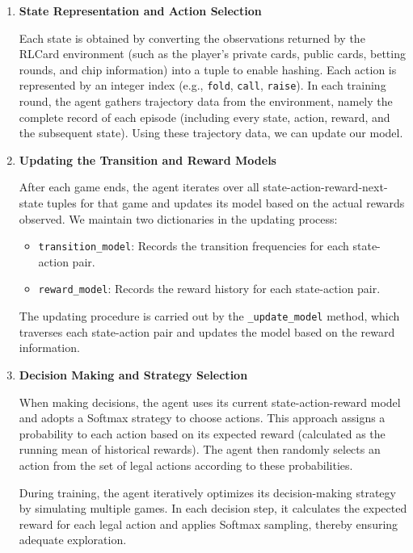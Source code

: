 \documentclass{article}
\begin{document}
\begin{enumerate}
    \item \textbf{State Representation and Action Selection}

    Each state is obtained by converting the observations returned by the RLCard environment (such as the player's private cards, public cards, betting rounds, and chip information) into a tuple to enable hashing. Each action is represented by an integer index (e.g., \texttt{fold}, \texttt{call}, \texttt{raise}). In each training round, the agent gathers trajectory data from the environment, namely the complete record of each episode (including every state, action, reward, and the subsequent state). Using these trajectory data, we can update our model.

    \item \textbf{Updating the Transition and Reward Models}

    After each game ends, the agent iterates over all state-action-reward-next-state tuples for that game and updates its model based on the actual rewards observed. We maintain two dictionaries in the updating process:
    \begin{itemize}
        \item \texttt{transition\_model}: Records the transition frequencies for each state-action pair.
        \item \texttt{reward\_model}: Records the reward history for each state-action pair.
    \end{itemize}

    The updating procedure is carried out by the \texttt{\_update\_model} method, which traverses each state-action pair and updates the model based on the reward information.

    \item \textbf{Decision Making and Strategy Selection}

    When making decisions, the agent uses its current state-action-reward model and adopts a Softmax strategy to choose actions. This approach assigns a probability to each action based on its expected reward (calculated as the running mean of historical rewards). The agent then randomly selects an action from the set of legal actions according to these probabilities.

    During training, the agent iteratively optimizes its decision-making strategy by simulating multiple games. In each decision step, it calculates the expected reward for each legal action and applies Softmax sampling, thereby ensuring adequate exploration.
\end{enumerate}
\end{document}

